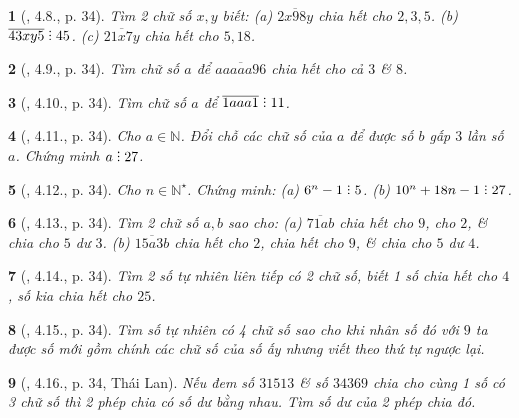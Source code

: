 \documentclass{article}
\newtheorem{baitoan}{}
\DeclareRobustCommand{\divby}{%
	\mathrel{\vbox{\baselineskip.65ex\lineskiplimit0pt\hbox{.}\hbox{.}\hbox{.}}}%
}
\begin{document}
\begin{baitoan}[\cite{Binh_boi_duong_Toan_6_tap_1}, 4.8., p. 34]
	Tìm 2 chữ số $x,y$ biết: (a) $\overline{2x98y}$ chia hết cho $2,3,5$. (b) $\overline{43xy5}\divby45$. (c) $\overline{21x7y}$ chia hết cho $5,18$.
\end{baitoan}

\begin{baitoan}[\cite{Binh_boi_duong_Toan_6_tap_1}, 4.9., p. 34]
	Tìm chữ số $a$ để $\overline{aaaaa96}$ chia hết cho cả $3$ \& $8$.
\end{baitoan}

\begin{baitoan}[\cite{Binh_boi_duong_Toan_6_tap_1}, 4.10., p. 34]
	Tìm chữ số $a$ để $\overline{1aaa1}\divby11$.
\end{baitoan}

\begin{baitoan}[\cite{Binh_boi_duong_Toan_6_tap_1}, 4.11., p. 34]
	Cho $a\in\mathbb{N}$. Đổi chỗ các chữ số của $a$ để được số $b$ gấp $3$ lần số $a$. Chứng minh $a\divby27$.
\end{baitoan}

\begin{baitoan}[\cite{Binh_boi_duong_Toan_6_tap_1}, 4.12., p. 34]
	Cho $n\in\mathbb{N}^\star$. Chứng minh: (a) $6^n - 1\divby5$. (b) $10^n + 18n - 1\divby27$.
\end{baitoan}

\begin{baitoan}[\cite{Binh_boi_duong_Toan_6_tap_1}, 4.13., p. 34]
	Tìm 2 chữ số $a,b$ sao cho: (a) $\overline{71ab}$ chia hết cho $9$, cho $2$, \& chia cho $5$ dư $3$. (b) $\overline{15a3b}$ chia hết cho $2$, chia hết cho $9$, \& chia cho $5$ dư $4$.
\end{baitoan}

\begin{baitoan}[\cite{Binh_boi_duong_Toan_6_tap_1}, 4.14., p. 34]
	Tìm 2 số tự nhiên liên tiếp có 2 chữ số, biết 1 số chia hết cho $4$, số kia chia hết cho $25$.
\end{baitoan}

\begin{baitoan}[\cite{Binh_boi_duong_Toan_6_tap_1}, 4.15., p. 34]
	Tìm số tự nhiên có 4 chữ số sao cho khi nhân số đó với $9$ ta được số mới gồm chính các chữ số của số ấy nhưng viết theo thứ tự ngược lại.
\end{baitoan}

\begin{baitoan}[\cite{Binh_boi_duong_Toan_6_tap_1}, 4.16., p. 34, Thái Lan]
	Nếu đem số $31513$ \& số $34369$ chia cho cùng 1 số có 3 chữ số thì 2 phép chia có số dư bằng nhau. Tìm số dư của 2 phép chia đó.
\end{baitoan}
\end{document}
